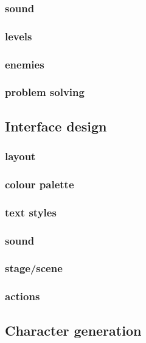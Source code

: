 \documentclass{article}
\begin{document}
\subsubsection{sound}

\subsubsection{levels}

\subsubsection{enemies}

\subsubsection{problem solving}

\subsection{Interface design}
\subsubsection{layout}

\subsubsection{colour palette}

\subsubsection{text styles}

\subsubsection{sound}

\subsubsection{stage/scene}

\subsubsection{actions}

\subsection{Character generation}
\end{document}
